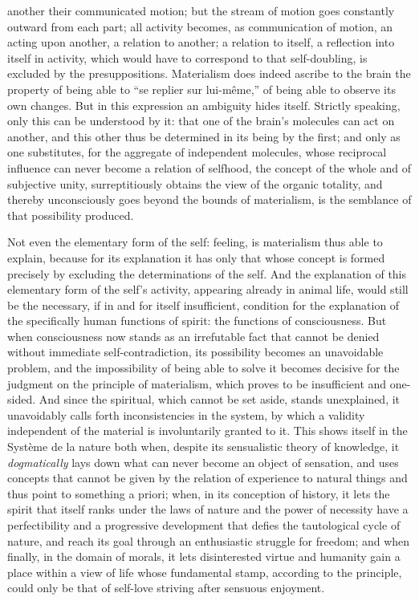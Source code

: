 another their communicated motion; but the stream of motion goes
constantly outward from each part; all activity becomes, as
communication of motion, an acting upon another, a relation to another;
a relation to itself, a reflection into itself in activity, which would
have to correspond to that self-doubling, is excluded by the
presuppositions. Materialism does indeed ascribe to the brain the
property of being able to ``se replier sur lui-même,'' of being able to
observe its own changes. But in this expression an ambiguity hides
itself. Strictly speaking, only this can be understood by it: that one
of the brain's molecules can act on another, and this other thus be
determined in its being by the first; and only as one substitutes, for
the aggregate of independent molecules, whose reciprocal influence can
never become a relation of selfhood, the concept of the whole and of
subjective unity, surreptitiously obtains the view of the organic
totality, and thereby unconsciously goes beyond the bounds of
materialism, is the semblance of that possibility produced.

Not even the elementary form of the self: feeling, is
materialism thus able to explain, because for its explanation it has
only that whose concept is formed precisely by excluding the
determinations of the self. And the explanation of this elementary form
of the self's activity, appearing already in animal life, would still
be the necessary, if in and for itself insufficient, condition for the
explanation of the specifically human functions of spirit: the
functions of consciousness. But when consciousness now stands as an
irrefutable fact that cannot be denied without immediate
self-contradiction, its possibility becomes an unavoidable problem, and
the impossibility of being able to solve it becomes decisive for the
judgment on the principle of materialism, which proves to be
insufficient and one-sided. And since the spiritual, which cannot be
set aside, stands unexplained, it unavoidably calls forth
inconsistencies in the system, by which a validity independent of the
material is involuntarily granted to it. This shows itself in the
Système de la nature both when, despite its sensualistic theory of
knowledge, it \emph{dogmatically} lays down what can never become an
object of sensation, and uses concepts that cannot be given by the
relation of experience to natural things and thus point to something a
priori; when, in its conception of history, it lets the spirit that
itself ranks under the laws of nature and the power of necessity have a
perfectibility and a progressive development that defies the
tautological cycle of nature, and reach its goal through an
enthusiastic struggle for freedom; and when finally, in the domain of
morals, it lets disinterested virtue and humanity gain a place within a
view of life whose fundamental stamp, according to the principle, could
only be that of self-love striving after sensuous enjoyment.

